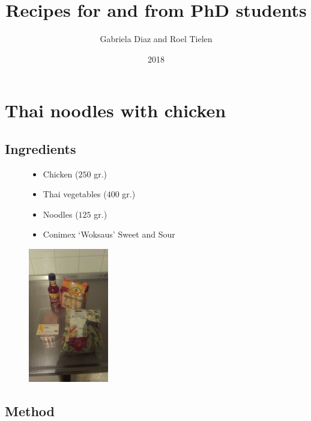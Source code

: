 \documentclass[a4paper,12pt]{report}
\title{Recipes for and from PhD students}
\date{2018\\ }
\author{Gabriela Diaz and Roel Tielen}
\begin{document}
\maketitle
\tableofcontents

\chapter{Thai noodles with chicken}

\section*{Ingredients}
\begin{figure}[h]

\begin{minipage}{0.65\textwidth}
\begin{itemize}
\item Chicken ($250$ gr.)
\item Thai vegetables ($400$ gr.)
\item Noodles ($125$ gr.)
\item Conimex `Woksaus' Sweet and Sour
\end{itemize}
\end{minipage}
\begin{minipage}{0.3\textwidth}
	\includegraphics[width=35mm,scale=0.07]{Images/noodles_ingredients.jpg}
\end{minipage}
\end{figure}


\section*{Method}
\end{document}
